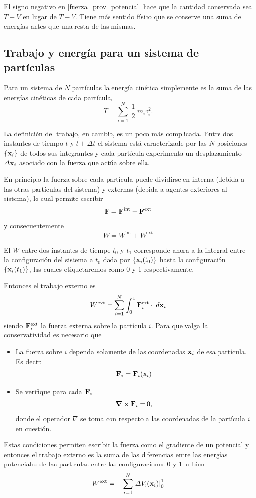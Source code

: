 \documentclass[10pt,oneside]{CBFT_book}
\begin{document}
El signo negativo en \eqref{fuerza_prov_potencial} hace que la cantidad conservada sea $T+V$ en lugar de $T-V$.
Tiene más sentido físico que se conserve una suma de energías antes que una resta de las mismas.

\subsection{Trabajo y energía para un sistema de partículas}

Para un sistema de $ N $ partículas la energía cinética simplemente es la suma de las energías cinéticas de cada 
partícula,
\[
	T = \sum_{i=1}^N \: \frac{1}{2} \: m_i v_i^2.
\]

La definición del trabajo, en cambio, es un poco más complicada. Entre dos instantes de tiempo $ t $ y $ t + \Delta t $ 
el sistema está caracterizado por las $ N $ posiciones $ \{\vb{x}_i\} $ de todos sus integrantes y cada partícula 
experimenta un desplazamiento $ \Delta \vb{x}_i $ asociado con la fuerza que actúa sobre ella.

En principio la fuerza sobre cada partícula puede dividirse en interna (debida a las otras partículas del sistema) y 
externas (debida a agentes exteriores al sistema), lo cual permite escribir
\[
	\vb{F} = \vb{F}^{\text{int}} + \vb{F}^{\text{ext}}
\]
y consecuentemente
\[
	W = W^{\text{int}} + W^{\text{ext}}
\]

El $ W $ entre dos instantes de tiempo $t_0$ y $t_1$ corresponde ahora a la integral entre la configuración del sistema 
a $t_0$ dada por $ \{\vb{x}_i(t_0)\} $ hasta la configuración $ \{\vb{x}_i(t_1)\} $, las cuales etiquetaremos como 0 y 
1 respectivamente. 

Entonces el trabajo externo es
\[
	W^{\text{ext}} = \sum_{i=1}^N \int_0^1 \vb{F}^{\text{ext}}_i \cdot \: d\vb{x}_i
\]
siendo $ \vb{F}^{\text{ext}}_i $ la fuerza externa sobre la partícula $i$. Para que valga la conservatividad es 
necesario que 
\begin{itemize}
 \item La fuerza sobre $i$ dependa solamente de las coordenadas $\vb{x}_i$ de esa partícula. Es decir:
 \[
	\vb{F}_i = \vb{F}_i(\vb{x}_i)
 \]
 \item Se verifique para cada $\vb{F}_i$ 
 \[
	\Nabla \times \vb{F}_i = 0,
 \]
 donde el operador $\nabla$ se toma con respecto a las coordenadas de la partícula $i$ en cuestión.
\end{itemize}

Estas condiciones permiten escribir la fuerza como el gradiente de un potencial y entonces el trabajo externo es la 
suma de las diferencias entre las energías potenciales de las partículas entre las configuraciones 0 y 1, o bien
\[
	W^{\text{ext}} = - \sum_{i=1}^N \left. \Delta V_i(\vb{x}_i) \right|_0^1
\]
\end{document}
